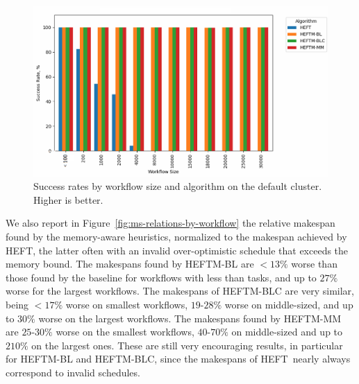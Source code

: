 \documentclass[conference]{IEEEtran}
\newcommand{\algo}[1]{\textsc{#1}}
\newcommand{\heft}{\algo{HEFT}\xspace}
\newcommand{\heftmm}{\algo{HEFTM-MM}\xspace}
\newcommand{\heftbl}{\algo{HEFTM-BL}\xspace}
\newcommand{\heftblc}{\algo{HEFTM-BLC}\xspace}
\newcommand{\new}[1]{{#1}}
\newcommand{\skug}[1]{{\color{blue}[SK: #1]}}
\begin{document}
\begin{figure}[tb]
  \centering
  \vspace{-0.4cm}
  \includegraphics[width=1.0\columnwidth] {images/success-rates-large2}
  \caption{Success rates by workflow size and algorithm on the default cluster. Higher is better.}
  \label{fig:success-rates-large}
\end{figure}

We also report in  Figure~\ref{fig:ms-relations-by-workflow} the relative makespan found
by the memory-aware heuristics, normalized to the
makespan achieved by \heft, \new{the latter} often with an invalid over-optimistic schedule that exceeds
the memory bound.
\new{The makespans found by \heftbl are $<13\%$ worse than those found by the baseline for workflows with less than \numprint{2000}
tasks, and up to $27\%$ worse for the largest workflows.
The makespans of \heftblc are very similar, being $<17\%$ worse on smallest workflows, $19$-$28\%$ worse on middle-sized,
and up to $30\%$ worse on the largest workflows.
The makespans found by \heftmm are $25$-$30\%$ worse on the smallest workflows, $40$-$70\%$ on middle-sized and up to
$210\%$ on the largest ones.} These are still very encouraging results,
in particular for \heftbl and \heftblc, since the makespans of \heft\ \new{nearly always} correspond to invalid schedules.



%
\end{document}

